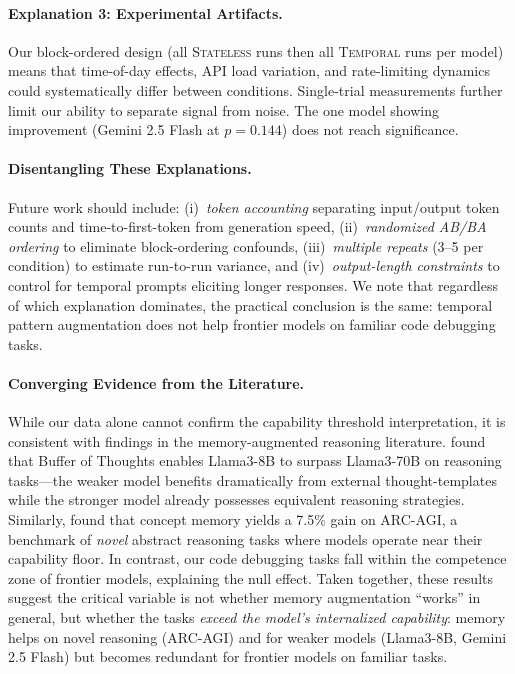 \documentclass[11pt]{article}
\begin{document}
\paragraph{Explanation 3: Experimental Artifacts.} Our block-ordered design (all \textsc{Stateless} runs then all \textsc{Temporal} runs per model) means that time-of-day effects, API load variation, and rate-limiting dynamics could systematically differ between conditions. Single-trial measurements further limit our ability to separate signal from noise. The one model showing improvement (Gemini 2.5 Flash at $p = 0.144$) does not reach significance.

\paragraph{Disentangling These Explanations.} Future work should include: (i)~\emph{token accounting} separating input/output token counts and time-to-first-token from generation speed, (ii)~\emph{randomized AB/BA ordering} to eliminate block-ordering confounds, (iii)~\emph{multiple repeats} (3--5 per condition) to estimate run-to-run variance, and (iv)~\emph{output-length constraints} to control for temporal prompts eliciting longer responses. We note that regardless of which explanation dominates, the practical conclusion is the same: temporal pattern augmentation does not help frontier models on familiar code debugging tasks.

\paragraph{Converging Evidence from the Literature.} While our data alone cannot confirm the capability threshold interpretation, it is consistent with findings in the memory-augmented reasoning literature. \citet{yang2024buffer} found that Buffer of Thoughts enables Llama3-8B to surpass Llama3-70B on reasoning tasks---the weaker model benefits dramatically from external thought-templates while the stronger model already possesses equivalent reasoning strategies. Similarly, \citet{ho2025arcmemo} found that concept memory yields a 7.5\% gain on ARC-AGI, a benchmark of \emph{novel} abstract reasoning tasks where models operate near their capability floor. In contrast, our code debugging tasks fall within the competence zone of frontier models, explaining the null effect. Taken together, these results suggest the critical variable is not whether memory augmentation ``works'' in general, but whether the tasks \emph{exceed the model's internalized capability}: memory helps on novel reasoning (ARC-AGI) and for weaker models (Llama3-8B, Gemini 2.5 Flash) but becomes redundant for frontier models on familiar tasks.
\end{document}
